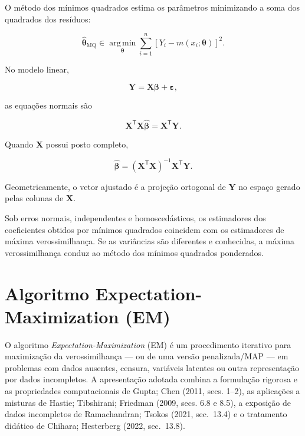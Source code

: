 \documentclass[
  letterpaper,
  DIV=11,
  numbers=noendperiod]{scrreprt}
\begin{document}
\begin{tcolorbox}[enhanced jigsaw, colback=white, leftrule=.75mm, colbacktitle=quarto-callout-note-color!10!white, breakable, titlerule=0mm, bottomtitle=1mm, title=\textcolor{quarto-callout-note-color}{\faInfo}\hspace{0.5em}{Síntese da seção}, colframe=quarto-callout-note-color-frame, toprule=.15mm, opacityback=0, bottomrule=.15mm, opacitybacktitle=0.6, arc=.35mm, toptitle=1mm, rightrule=.15mm, coltitle=black, left=2mm]

O método dos mínimos quadrados estima os parâmetros minimizando a soma
dos quadrados dos resíduos:

\[\widehat{\boldsymbol\theta}_{\mathrm{MQ}}
\in
\operatorname*{arg\,min}_{\boldsymbol\theta}
\sum_{i=1}^n
\left[
Y_i-m(x_i;\boldsymbol\theta)
\right]^2.\]

No modelo linear,

\[\mathbf{Y}
=
\mathbf{X}\boldsymbol\beta
+
\boldsymbol\varepsilon,\]

as equações normais são

\[\mathbf{X}^\mathsf{T}\mathbf{X}
\widehat{\boldsymbol\beta}
=
\mathbf{X}^\mathsf{T}\mathbf{Y}.\]

Quando \(\mathbf{X}\) possui posto completo,

\[\widehat{\boldsymbol\beta}
=
(\mathbf{X}^\mathsf{T}\mathbf{X})^{-1}
\mathbf{X}^\mathsf{T}\mathbf{Y}.\]

Geometricamente, o vetor ajustado é a projeção ortogonal de
\(\mathbf{Y}\) no espaço gerado pelas colunas de \(\mathbf{X}\).

Sob erros normais, independentes e homoscedásticos, os estimadores dos
coeficientes obtidos por mínimos quadrados coincidem com os estimadores
de máxima verossimilhança. Se as variâncias são diferentes e conhecidas,
a máxima verossimilhança conduz ao método dos mínimos quadrados
ponderados.

\end{tcolorbox}

\section{Algoritmo Expectation-Maximization
(EM)}\label{sec-algoritmo-em}

O algoritmo \emph{Expectation-Maximization} (EM) é um procedimento
iterativo para maximização da verossimilhança --- ou de uma versão
penalizada/MAP --- em problemas com dados ausentes, censura, variáveis
latentes ou outra representação por dados incompletos. A apresentação
adotada combina a formulação rigorosa e as propriedades computacionais
de Gupta; Chen (2011, secs. 1--2), as aplicações a misturas de Hastie;
Tibshirani; Friedman (2009, secs. 6.8 e 8.5), a exposição de dados
incompletos de Ramachandran; Tsokos (2021, sec.~13.4) e o tratamento
didático de Chihara; Hesterberg (2022, sec.~13.8).
\end{document}
